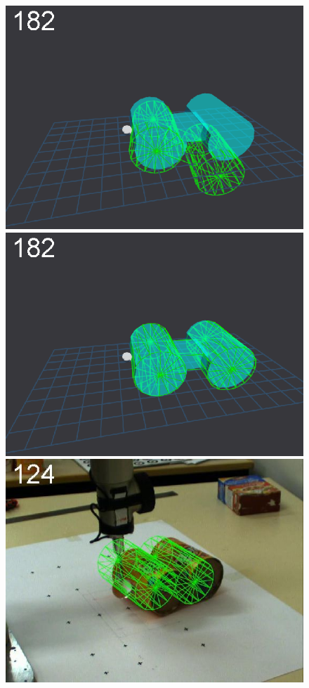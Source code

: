 \begin{figure}[tbp]
{\includegraphics[width=\imgCXwid]{images/C5_2exp_6_3}
\includegraphics[width=\imgCXwid]{images/C5_3exp_6_3}
\includegraphics[width=\imgCXwid]{images/C2_3exp_75_3}
}
\end{figure}
